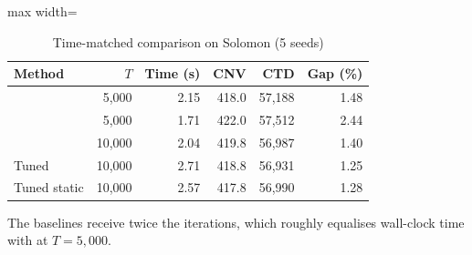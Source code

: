 \begin{table}[t]
\centering
\caption{Time-matched comparison on Solomon (5 seeds)}\label{tab:timematched}
\setlength{\tabcolsep}{3pt}
\begin{adjustbox}{max width=\linewidth}
\begin{tabular}{lrrrrr}
\toprule
Method & $T$ & Time (s) & CNV & CTD & Gap (\%)\\ \midrule
\sgalns{} & 5,000 & 2.15 & 418.0 & 57,188 & 1.48\\
\sgc{} & 5,000 & 1.71 & 422.0 & 57,512 & 2.44\\
\Rw{} & 10,000 & 2.04 & 419.8 & 56,987 & 1.40\\
Tuned \Rw{} & 10,000 & 2.71 & 418.8 & 56,931 & 1.25\\
Tuned static & 10,000 & 2.57 & 417.8 & 56,990 & 1.28\\
\bottomrule
\end{tabular}
\end{adjustbox}
\par\vspace{2pt}\parbox{\linewidth}{\footnotesize The baselines receive twice the iterations, which roughly equalises wall-clock time with \sgalns{} at $T=5{,}000$.}
\end{table}
